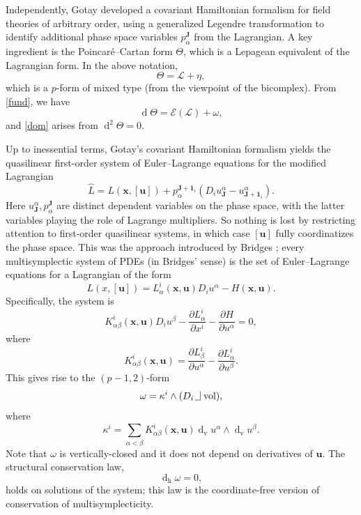 \documentclass[11pt]{article} %
\numberwithin{equation}{section}
\newcommand{\intpsym}{\,\, \setlength{\unitlength}{0.4mm}
	\begin{picture}(0, 0)(5, 5)%
	\put(0, 4){\line(1,0){5}} \put(5,4){\line(0,1){8}}
	\end{picture}\,\,}
\newcommand{\intp}{\,\,\intpsym}
\newcommand{\upd}{\operatorname{d}}
\newcommand{\uph}{\operatorname{h}}
\newcommand{\upv}{\operatorname{v}}
\newcommand{\dv}{\upd_{\upv}\!}
\newcommand{\mbu}{\mathbf{u}}
\newcommand{\mbx}{\mathbf{x}}
\newcommand{\mbJ}{\mathbf{J}}
\newcommand{\mcE}{\mathcal{E}}
\newcommand{\msL}{\mathscr{L}}
\theoremstyle{plain}
\theoremstyle{definition}
\begin{document}
Independently, Gotay \cite{Gotay} developed a covariant Hamiltonian formalism for field theories of arbitrary order, using a generalized Legendre transformation to identify additional phase space variables $p_\alpha^{\mbJ}$ from the Lagrangian. A key ingredient is the Poincar\'{e}--Cartan form $\Theta$, which is a Lepagean equivalent of the Lagrangian form. In the above notation,
\begin{equation}
\Theta=\msL+\eta,
\end{equation}
which is a $p$-form of mixed type (from the viewpoint of the bicomplex). From \eqref{fund}, we have
\begin{equation}
\upd\!\Theta=\mcE(\msL)+\omega,
\end{equation}
and \eqref{dom} arises from $\upd^2\!\Theta=0$.


Up to inessential terms, Gotay's covariant Hamiltonian formalism yields the quasilinear first-order system of Euler--Lagrange equations for the modified Lagrangian
\begin{equation}
\widehat{L}=L(\mbx,[\mbu])+p_\alpha^{\mbJ+\mathbf{1}_i}(D_iu^\alpha_\mbJ-u^\alpha_{\mbJ+\mathbf{1}_i}).
\end{equation}
Here $u^\alpha_\mbJ, p_\alpha^{\mbJ}$ are distinct dependent variables on the phase space, with the latter variables playing the role of Lagrange multipliers. So nothing is lost by restricting attention to first-order quasilinear systems, in which case $[\mbu]$ fully coordinatizes the phase space. This was the approach introduced by Bridges \cite{Br1997b}; every multisymplectic system of PDEs (in Bridges' sense) is the set of Euler--Lagrange equations for a Lagrangian of the form 
\begin{equation}\label{lag}
L(x,[\mbu])=L_{\alpha}^i(\mbx,\mbu)D_iu^{\alpha}-H(\mbx,\mbu).
\end{equation}
Specifically, the system is 
\begin{equation}
K_{\alpha\beta}^i(\mbx,\mbu)D_iu^{\beta}-\frac{\partial L_{\alpha}^i}{\partial x^i}-\frac{\partial H}{\partial
u^{\alpha}}=0,
\end{equation}
where
\begin{equation}
K^i_{\alpha\beta}(\mbx,\mbu)=\frac{\partial L_{\beta}^i}{\partial
u^{\alpha}}-\frac{\partial L_{\alpha}^i}{\partial u^{\beta}}.
\end{equation}
This gives rise to the $(p-1,2)$-form
\begin{equation}\label{omkap}
\omega=\kappa^i\wedge(D_i\intp \text{vol}),
\end{equation}
where
\begin{equation}
\kappa^i=\sum_{\alpha<\beta}K_{\alpha\beta}^i(\mbx,\mbu)\dv u^{\alpha}\wedge\dv u^{\beta}.
\end{equation}
Note that $\omega$ is vertically-closed and it does not depend on derivatives of $\mbu$. The structural conservation law,
\begin{equation}
\upd_{\uph}\!\omega=0,    
\end{equation}
holds on solutions of the system; this law is the coordinate-free version of conservation of multisymplecticity.
\end{document}
